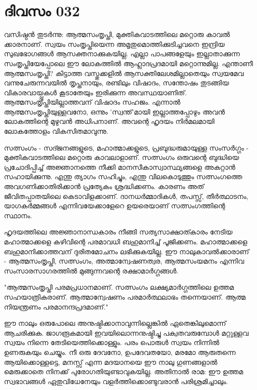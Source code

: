  
\section{ദിവസം 032}


വസിഷ്ഠന്‍ തുടര്‍ന്നു: ആത്മസംതൃപ്തി, മുക്തികവാടത്തിലെ മറ്റൊരു കാവല്‍ ക്കാരനാണ്‌. സ്വയം സംതൃപ്തിയെന്ന അമൃതുമൊത്തിക്കുടിച്ചവനെ ഇന്ദ്രിയ  സുഖഭോഗങ്ങള്‍ ആസക്തനാക്കുകയില്ല. എല്ലാ പാപങ്ങളേയും ഇല്ലാതാക്കുന്ന സംതൃപ്തിയേപ്പോലെ ഈ ലോകത്തില്‍ ആഹ്ലാദപ്രദമായി മറ്റൊന്നുമില്ല. എന്താണീ ആത്മസംതൃപ്തി? കിട്ടാത്ത വസ്തുക്കളില്‍ ആസക്തിലേശമില്ലാതെയും സ്വയമേവ വന്നുചേരുന്നവയില്‍ തൃപ്തനായും, രണ്ടിലും വിഷാദം, സന്തോഷം തുടങ്ങിയ വികാരവായ്പ്പുകള്‍ കൂടാതേയും ഇരിക്കുന്ന അവസ്ഥയാണിത്‌. ആത്മസംതൃപ്തിയില്ലാത്തവന്‌ വിഷാദം സഹജം. എന്നാല്‍ ആത്മസംതൃപ്തിയുള്ളവനോ, ഒന്നും 'സ്വന്ത്‌'മായി ഇല്ലാത്തപ്പോഴും അവന്‍ ലോകത്തിന്റെ മുഴുവന്‍ അധിപനാണ്‌. അവന്റെ ഹൃദയം നിര്‍മലമായി ലോകത്തോളം വികസിതമാവുന്നു.

സത്സംഗം - സദ്ജനങ്ങളുടെ, മഹാത്മാക്കളുടെ, പ്രബുദ്ധരുമായുള്ള സംസര്‍ഗ്ഗം - മുക്തികവാടത്തിലെ മറ്റൊരു കാവലാളാണ്‌. സത്സംഗം ഒരുവന്റെ ബുദ്ധിയെ പ്രചോദിപ്പിച്ച്‌ അജ്ഞാനത്തെ നീക്കി മാനസീകാസ്വാസ്ഥ്യങ്ങളെ അകറ്റാന്‍ സഹായിക്കുന്നു. എന്തു ത്യാഗം സഹിച്ചും, എന്തു വിലകൊടുത്തും സത്സംഗത്തെ അവഗണിക്കാതിരിക്കാന്‍ പ്രത്യേകം ശ്രദ്ധിക്കണം. കാരണം അത്‌ ജീവിതപ്പാതയിലെ കെടാവിളക്കാണ്‌. ദാനധര്‍മ്മാദികള്‍, തപസ്സ്‌, തീര്‍ത്ഥാടനം, യാഗകര്‍മ്മങ്ങള്‍ എന്നിവയേക്കാളേറെ ഉയരെയാണ്‌ സത്സംഗത്തിന്റെ സ്ഥാനം.

ഹൃദയത്തിലെ അജ്ഞാനാന്ധകാരം നീങ്ങി സത്യസാക്ഷാത്കാരം നേടിയ മഹാത്മാക്കളെ കഴിവിന്റെ പരമാവധി ബഹുമാനിച്ച്‌ പൂജിക്കണം. മഹാത്മാക്കളെ ബഹുമാനിക്കാത്തവന്‌ ദുരിതമോചനം ലഭിക്കുകയില്ല. ഈ നാലുകാവല്‍ക്കാരാണ്‌ - ആത്മസംതൃപ്തി, സത്സംഗം, അത്മാന്വേഷണത്വര, ആത്മസംയമനം എന്നിവ സംസാരസാഗരത്തില്‍ മുങ്ങുന്നവന്റെ രക്ഷാമാര്‍ഗ്ഗങ്ങള്‍. 

"ആത്മസംതൃപ്തി പരമപ്രധാനമാണ്‌. സത്സംഗം ലക്ഷ്യമാര്‍ഗ്ഗത്തിലെ ഉത്തമ സഹയാത്രികരാണ്‌. ആത്മാന്വേഷണം പരമാര്‍ത്ഥലാഭം തന്നെയാണ്‌. ആത്മ നിയന്ത്രണം പരമാനന്ദപ്രദമാണ്‌." 

ഈ നാലും ഒരുപോലെ അനുഷ്ഠിക്കാനാവുന്നില്ലെങ്കില്‍ ഏതെങ്കിലുമൊന്ന് ആചരിക്കുക. ജാഗരൂകമായി ഇവയിലൊന്നനുഷ്ഠിച്ചു പക്വതവരുമ്പോള്‍ മറ്റുള്ളവ സ്വയം നിന്നെ തേടിയെത്തിക്കൊള്ളും. പരം പൊരുള്‍ സ്വയം നിന്നില്‍ ഉണരുകയും ചെയ്യും. നീ ഒരു ദേവനോ, ഉപദേവതയോ, മരമോ ആരുതന്നെ ആയിക്കൊള്ളട്ടെ, മനസ്സ്‌ എന്ന മദയാനയെ ഈ നാലു ഗുണങ്ങളാല്‍ മെരുക്കാതെ നിനക്ക്‌ പുരോഗതിയുണ്ടാവുകയില്ല. അതിനാല്‍ രാമ: ഈ ഉത്തമ സ്വഭാവങ്ങള്‍ ഏതുവിധേനേയും വളര്‍ത്തിക്കൊണ്ടുവരാന്‍ പരിശ്രമിച്ചാലും. 
